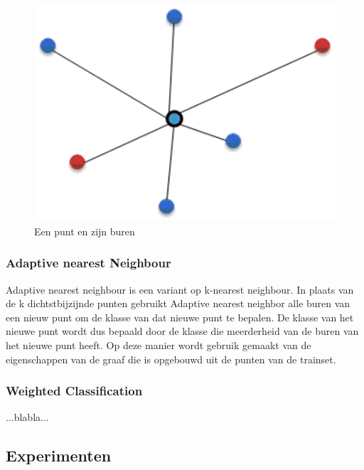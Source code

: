 \documentclass{article}
\begin{document}
\begin{figure}[!h]
    \centering
        \includegraphics[scale=0.4, page=1]{buren}
	\caption{Een punt en zijn buren}
    \label{buren}
\end{figure}

\subsubsection{Adaptive nearest Neighbour}
Adaptive nearest neighbour is een variant op k-nearest neighbour. In plaats van de k dichtstbijzijnde punten gebruikt Adaptive nearest neighbor alle buren van een nieuw punt om de klasse van dat nieuwe punt te bepalen. De klasse van het nieuwe punt wordt dus bepaald door de klasse die meerderheid van de buren van het nieuwe punt heeft. Op deze manier wordt gebruik gemaakt van de eigenschappen van de graaf die is opgebouwd uit de punten van de trainset. 

\subsubsection{Weighted Classification}
...blabla...

\subsection{Experimenten}
\end{document}
